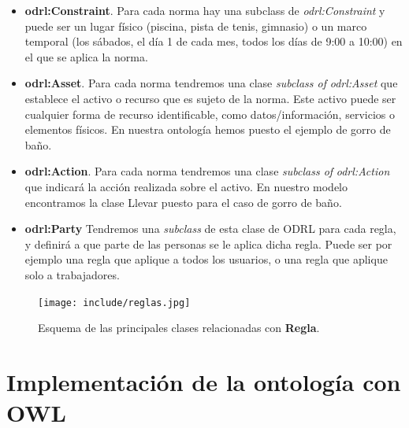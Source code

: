 \documentclass[a4paper,12pt]{article}
\begin{document}
	\begin{itemize}
		\item \textbf{odrl:Constraint}. Para cada norma hay una subclass de \textit{odrl:Constraint} y puede ser un
lugar físico (piscina, pista de tenis, gimnasio) o un marco temporal (los sábados, el día 1
de cada mes, todos los días de 9:00 a 10:00) en el que se aplica la norma.
		\item \textbf{odrl:Asset}. Para cada norma tendremos una clase \textit{subclass of} \textit{odrl:Asset} que establece el
activo o recurso que es sujeto de la norma. Este activo puede ser cualquier forma de
recurso identificable, como datos/información, servicios o elementos físicos. En nuestra
ontología hemos puesto el ejemplo de gorro de baño.
		\item \textbf{odrl:Action}. Para cada norma tendremos una clase \textit{subclass of} \textit{odrl:Action} que indicará
la acción realizada sobre el activo. En nuestro modelo encontramos la clase Llevar puesto
para el caso de gorro de baño.
		\item \textbf{odrl:Party} Tendremos una \textit{subclass} de esta clase de ODRL para cada regla, y definirá a
que parte de las personas se le aplica dicha regla. Puede ser por ejemplo una regla que
aplique a todos los usuarios, o una regla que aplique solo a trabajadores.
	\end{itemize}
	
	\begin{figure}[H]
		\centering
		\texttt{[image: include/reglas.jpg]}
		\caption{Esquema de las principales clases relacionadas con \textbf{Regla}.}
	\end{figure}
	
	\section{Implementación de la ontología con OWL}
	
\end{document}

